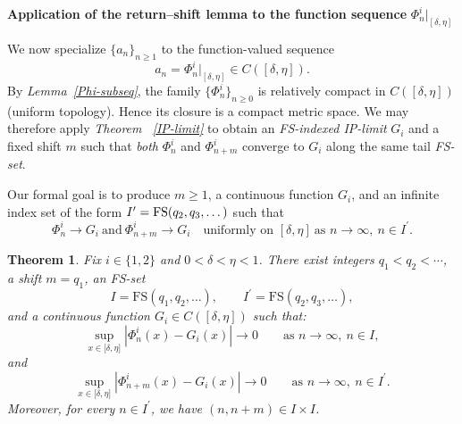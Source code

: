 \documentclass[onecolumn]{article}
\newtheorem{theorem}{Theorem}
\begin{document}
\begin{flushleft}
\textbf{Application of the return--shift lemma to the function sequence }$%
\Phi _{n}^{i}|_{[\delta ,\eta ]}$
\end{flushleft}

We now specialize $\{a_{n}\}_{n\geq 1}$ to the function-valued sequence 
\begin{equation}
a_{n}=\Phi _{n}^{i}|_{[\delta ,\eta ]}\in C([\delta ,\eta ]).  \label{1010}
\end{equation}%
By \textit{Lemma~\ref{Phi-subseq}}, the family $\{\Phi _{n}^{i}\}_{n\geq 0}$
is relatively compact in $C([\delta ,\eta ])$ (uniform topology). Hence its
closure is a compact metric space. We may therefore apply \textit{Theorem~%
\ref{IP-limit}} to obtain an \textit{FS-indexed IP-limit} $G_{i}$ and a
fixed shift $m$ such that \emph{both} $\Phi _{n}^{i}$ and $\Phi _{n+m}^{i}$
converge to $G_{i}$ along the same tail \textit{FS-set}.

\medskip \noindent Our formal goal is to produce $m\geq 1$, a continuous
function $G_{i}$, and an infinite index set of the form $I^{\prime }=\mathrm{%
FS}(q_{2},q_{3},\dots )$ such that 
\begin{equation}
\Phi _{n}^{i}\rightarrow G_{i}\ \text{and}\ \Phi _{n+m}^{i}\rightarrow
G_{i}\quad \text{uniformly on }[\delta ,\eta ]\ \text{as }n\rightarrow
\infty ,\ n\in I^{\prime }.  \label{1011}
\end{equation}

\begin{theorem}
\label{Phi-returnshift} Fix $i\in \{1,2\}$ and $0<\delta <\eta <1$. There
exist integers $q_{1}<q_{2}<\cdots $, a shift $m=q_{1}$, an FS-set 
\begin{equation}
I=\mathrm{FS}(q_{1},q_{2},\dots ),\qquad I^{\prime }=\mathrm{FS}%
(q_{2},q_{3},\dots ),  \label{1012}
\end{equation}%
and a continuous function $G_{i}\in C([\delta ,\eta ])$ such that: 
\begin{equation}
\sup_{x\in \lbrack \delta ,\eta ]}|\Phi _{n}^{i}(x)-G_{i}(x)|\rightarrow
0\qquad \text{as }n\rightarrow \infty ,\ n\in I,  \label{1013}
\end{equation}%
and 
\begin{equation}
\sup_{x\in \lbrack \delta ,\eta ]}|\Phi _{n+m}^{i}(x)-G_{i}(x)|\rightarrow
0\qquad \text{as }n\rightarrow \infty ,\ n\in I^{\prime }.  \label{1014}
\end{equation}%
Moreover, for every $n\in I^{\prime }$, we have $(n,n+m)\in I\times I$.
\end{theorem}
\end{document}
